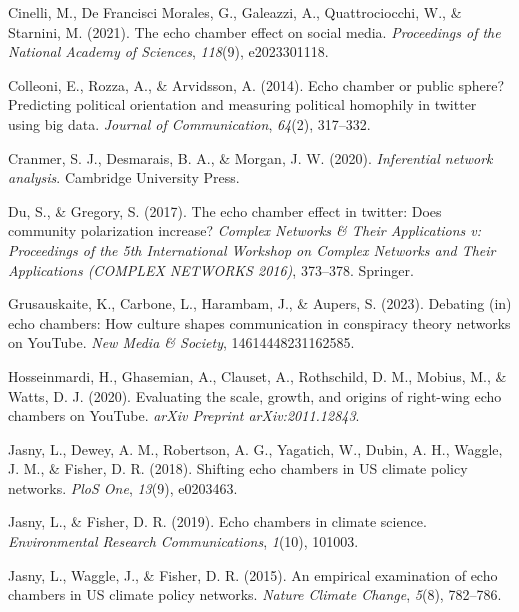 \documentclass[
  man,floatsintext]{apa6}
\newlength{\cslhangindent}
\newenvironment{CSLReferences}[2] %
 {\begin{list}{}{%
  \setlength{\itemindent}{0pt}
  \setlength{\leftmargin}{0pt}
  \setlength{\parsep}{0pt}
  \ifodd #1
   \setlength{\leftmargin}{\cslhangindent}
   \setlength{\itemindent}{-1\cslhangindent}
  \fi
  \setlength{\itemsep}{#2\baselineskip}}}
 {\end{list}}
\begin{document}
\begingroup
\setlength{\parindent}{-0.5in}
\setlength{\leftskip}{0.5in}

\label{refs}
\begin{CSLReferences}{1}{0}
Cinelli, M., De Francisci Morales, G., Galeazzi, A., Quattrociocchi, W., \& Starnini, M. (2021). The echo chamber effect on social media. \emph{Proceedings of the National Academy of Sciences}, \emph{118}(9), e2023301118.

Colleoni, E., Rozza, A., \& Arvidsson, A. (2014). Echo chamber or public sphere? Predicting political orientation and measuring political homophily in twitter using big data. \emph{Journal of Communication}, \emph{64}(2), 317--332.

Cranmer, S. J., Desmarais, B. A., \& Morgan, J. W. (2020). \emph{Inferential network analysis}. Cambridge University Press.

Du, S., \& Gregory, S. (2017). The echo chamber effect in twitter: Does community polarization increase? \emph{Complex Networks \& Their Applications v: Proceedings of the 5th International Workshop on Complex Networks and Their Applications (COMPLEX NETWORKS 2016)}, 373--378. Springer.

Grusauskaite, K., Carbone, L., Harambam, J., \& Aupers, S. (2023). Debating (in) echo chambers: How culture shapes communication in conspiracy theory networks on YouTube. \emph{New Media \& Society}, 14614448231162585.

Hosseinmardi, H., Ghasemian, A., Clauset, A., Rothschild, D. M., Mobius, M., \& Watts, D. J. (2020). Evaluating the scale, growth, and origins of right-wing echo chambers on YouTube. \emph{arXiv Preprint arXiv:2011.12843}.

Jasny, L., Dewey, A. M., Robertson, A. G., Yagatich, W., Dubin, A. H., Waggle, J. M., \& Fisher, D. R. (2018). Shifting echo chambers in US climate policy networks. \emph{PloS One}, \emph{13}(9), e0203463.

Jasny, L., \& Fisher, D. R. (2019). Echo chambers in climate science. \emph{Environmental Research Communications}, \emph{1}(10), 101003.

Jasny, L., Waggle, J., \& Fisher, D. R. (2015). An empirical examination of echo chambers in US climate policy networks. \emph{Nature Climate Change}, \emph{5}(8), 782--786.


\end{CSLReferences}
\end{document}
